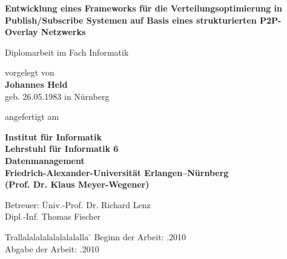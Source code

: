 \begin{titlepage}
  
  \begin{center}
    
    {\Huge \bf
Entwicklung eines Frameworks für die Verteilungsoptimierung in Publish/Subscribe Systemen auf Basis eines strukturierten P2P-Overlay Netzwerks    } 
    
    \vspace*{1cm}
    Diplomarbeit im Fach Informatik
    \vspace{2cm}
    
    {\large vorgelegt von} \\
    \vspace*{0.7cm}
    {\Large \bf Johannes Held} \\
    \vspace*{0.7cm}
    {\large geb. 26.05.1983 in Nürnberg} 
    
    \vspace{2cm}
    
    angefertigt am 

    \vspace{1cm}
    
    {\bf 
      Institut für Informatik \\
      Lehrstuhl für Informatik 6\\
      Datenmanagement \\
      Friedrich-Alexander-Universität Erlangen--Nürnberg \\
      (Prof. Dr. Klaus Meyer-Wegener)
      }
    
    \vspace{1cm}
\end{center}
\begin{tabbing}
    Betreuer: \= Univ.-Prof. Dr. Richard Lenz \\
    \> Dipl.-Inf. Thomas Fischer 
\end{tabbing}
    \vspace{1cm}
    
    
\begin{tabbing}
	Trallalalalalalalalalalla \= \kill
	Beginn der Arbeit:   .2010 \\
  Abgabe der Arbeit:   .2010
\end{tabbing}
    
  
\end{titlepage}

\clearpage{\pagestyle{empty}\cleardoublepage}

